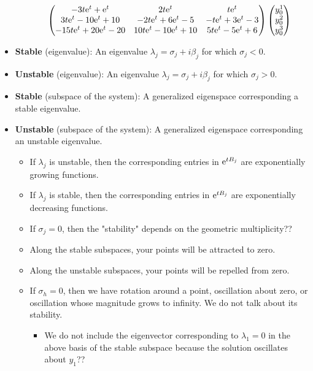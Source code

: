 \documentclass[../notes.tex]{subfiles}
\begin{document}
\begin{itemize}
\begin{itemize}
\begin{align*}
\begin{pmatrix}
                -3t\e[t]+\e[t] & 2t\e[t] & t\e[t]\\
                3t\e[t]-10\e[t]+10 & -2t\e[t]+6\e[t]-5 & -t\e[t]+3\e[t]-3\\
                -15t\e[t]+20\e[t]-20 & 10t\e[t]-10\e[t]+10 & 5t\e[t]-5\e[t]+6\\
            \end{pmatrix}
            \begin{pmatrix}
                y_0^1\\
                y_0^2\\
                y_0^3\\
            \end{pmatrix}
        \end{align*}
    \end{itemize}
    \item \textbf{Stable} (eigenvalue): An eigenvalue $\lambda_j=\sigma_j+i\beta_j$ for which $\sigma_j<0$.
    \item \textbf{Unstable} (eigenvalue): An eigenvalue $\lambda_j=\sigma_j+i\beta_j$ for which $\sigma_j>0$.
    \item \textbf{Stable} (subspace of the system): A generalized eigenspace corresponding a stable eigenvalue.
    \item \textbf{Unstable} (subspace of the system): A generalized eigenspace corresponding an unstable eigenvalue.
    \begin{itemize}
        \item If $\lambda_j$ is unstable, then the corresponding entries in $\e[tB_j]$ are exponentially growing functions.
        \item If $\lambda_j$ is stable, then the corresponding entries in $\e[tB_j]$ are exponentially decreasing functions.
        \item If $\sigma_j=0$, then the "stability" depends on the geometric multiplicity??
        \item Along the stable subspaces, your points will be attracted to zero.
        \item Along the unstable subspaces, your points will be repelled from zero.
        \item If $\sigma_h=0$, then we have rotation around a point, oscillation about zero, or oscillation whose magnitude grows to infinity. We do not talk about its stability.
        \begin{itemize}
            \item We do not include the eigenvector corresponding to $\lambda_1=0$ in the above basis of the stable subspace because the solution oscillates about $y_1$??

\end{itemize}
\end{itemize}
\end{itemize}
\end{document}
